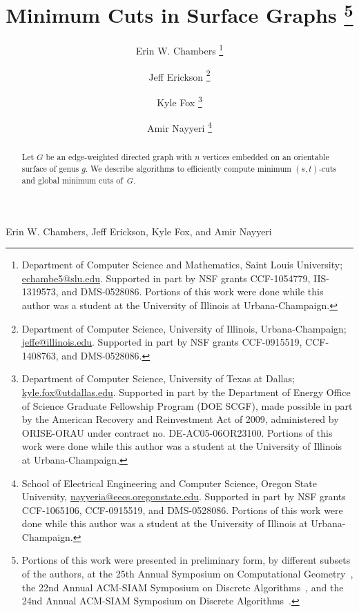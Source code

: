 \documentclass[11pt,twoside]{article}
\begin{document}
\pagestyle{myheadings}
		 {Erin W. Chambers, Jeff Erickson, Kyle Fox, and Amir Nayyeri}

\begin{titlepage}

\title{Minimum Cuts in Surface Graphs%
\thanks{
Portions of this work were presented in preliminary form, by different subsets of the authors, at the 25th Annual Symposium on Computational Geometry~\cite{cen-mcshc-09}, the 22nd Annual ACM-SIAM Symposium on Discrete Algorithms~\cite{en-mcsnc-11}, and the 24nd Annual ACM-SIAM Symposium on Discrete Algorithms~\cite{efn-gmcse-12}.
}}

\author{
Erin W. Chambers%
	\thanks{Department of Computer Science and Mathematics,
	Saint Louis University;
	\url{echambe5@slu.edu}.
	Supported in part by NSF grants CCF-1054779, IIS-1319573, and DMS-0528086.
	Portions of this work were done while this author was a student at the University of Illinois at Urbana-Champaign.}
%
\and
Jeff Erickson%
	\thanks{Department of Computer Science,
	University of Illinois, Urbana-Champaign;
	\url{jeffe@illinois.edu}.
	Supported in part by NSF grants CCF-0915519, CCF-1408763, and DMS-0528086.
  }
%
\and
Kyle Fox%
	\thanks{Department of Computer Science,
	University of Texas at Dallas;
	\url{kyle.fox@utdallas.edu}.
	Supported in part by the Department of Energy Office of Science Graduate Fellowship Program (DOE SCGF), made possible in part by the American Recovery and Reinvestment Act of 2009, administered by ORISE-ORAU under contract no. DE-AC05-06OR23100.
	Portions of this work were done while this author was a student at the University of Illinois at Urbana-Champaign.}
%
\and
Amir Nayyeri%
	\thanks{School of Electrical Engineering and Computer Science,
	Oregon State University,
	\url{nayyeria@eecs.oregonstate.edu}.
	Supported in part by NSF grants CCF-1065106, CCF-0915519, and DMS-0528086.
	Portions of this work were done while this author was a student at the University of Illinois at Urbana-Champaign.}
}

\DRAFT

\maketitle
\begin{abstract}
Let $G$ be an edge-weighted directed graph with $n$ vertices embedded on an orientable surface of genus $g$.
We describe algorithms to efficiently compute minimum $(s,t)$-cuts and global minimum cuts of~$G$.
\end{abstract}



\end{titlepage}
\end{document}
